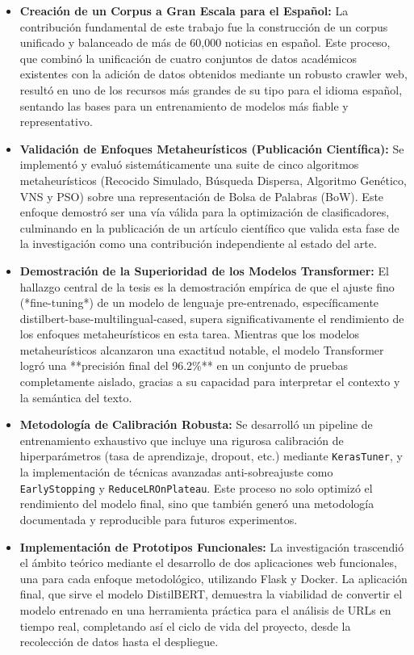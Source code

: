 \begin{itemize}
    \item \textbf{Creación de un Corpus a Gran Escala para el Español:} La contribución fundamental de este trabajo fue la construcción de un corpus unificado y balanceado de más de 60,000 noticias en español. Este proceso, que combinó la unificación de cuatro conjuntos de datos académicos existentes con la adición de datos obtenidos mediante un robusto crawler web, resultó en uno de los recursos más grandes de su tipo para el idioma español, sentando las bases para un entrenamiento de modelos más fiable y representativo.

    \item \textbf{Validación de Enfoques Metaheurísticos (Publicación Científica):} Se implementó y evaluó sistemáticamente una suite de cinco algoritmos metaheurísticos (Recocido Simulado, Búsqueda Dispersa, Algoritmo Genético, VNS y PSO) sobre una representación de Bolsa de Palabras (BoW). Este enfoque demostró ser una vía válida para la optimización de clasificadores, culminando en la publicación de un artículo científico que valida esta fase de la investigación como una contribución independiente al estado del arte.

    \item \textbf{Demostración de la Superioridad de los Modelos Transformer:} El hallazgo central de la tesis es la demostración empírica de que el ajuste fino (*fine-tuning*) de un modelo de lenguaje pre-entrenado, específicamente distilbert-base-multilingual-cased, supera significativamente el rendimiento de los enfoques metaheurísticos en esta tarea. Mientras que los modelos metaheurísticos alcanzaron una exactitud notable, el modelo Transformer logró una **precisión final del 96.2\%** en un conjunto de pruebas completamente aislado, gracias a su capacidad para interpretar el contexto y la semántica del texto.

    \item \textbf{Metodología de Calibración Robusta:} Se desarrolló un pipeline de entrenamiento exhaustivo que incluye una rigurosa calibración de hiperparámetros (tasa de aprendizaje, dropout, etc.) mediante \texttt{KerasTuner}, y la implementación de técnicas avanzadas anti-sobreajuste como \texttt{EarlyStopping} y \texttt{ReduceLROnPlateau}. Este proceso no solo optimizó el rendimiento del modelo final, sino que también generó una metodología documentada y reproducible para futuros experimentos.

    \item \textbf{Implementación de Prototipos Funcionales:} La investigación trascendió el ámbito teórico mediante el desarrollo de dos aplicaciones web funcionales, una para cada enfoque metodológico, utilizando Flask y Docker. La aplicación final, que sirve el modelo DistilBERT, demuestra la viabilidad de convertir el modelo entrenado en una herramienta práctica para el análisis de URLs en tiempo real, completando así el ciclo de vida del proyecto, desde la recolección de datos hasta el despliegue.
\end{itemize}

